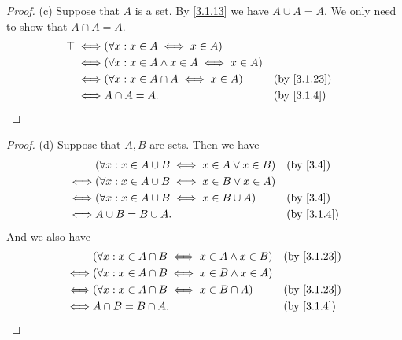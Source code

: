 \begin{proof}{(c)}
  Suppose that \(A\) is a set.
  By \cref{3.1.13} we have \(A \cup A = A\).
  We only need to show that \(A \cap A = A\).
  \begin{align*}
    \top \iff & (\forall x : x \in A \iff x \in A)                                              \\
    \iff      & (\forall x : x \in A \land x \in A \iff x \in A)                                \\
    \iff      & (\forall x : x \in A \cap A \iff x \in A)        &  & \text{(by \cref{3.1.23})} \\
    \iff      & A \cap A = A.                                    &  & \text{(by \cref{3.1.4})}
  \end{align*}
\end{proof}

\begin{proof}{(d)}
  Suppose that \(A, B\) are sets.
  Then we have
  \begin{align*}
         & (\forall x : x \in A \cup B \iff x \in A \lor x \in B) &  & \text{(by \cref{3.4})}   \\
    \iff & (\forall x : x \in A \cup B \iff x \in B \lor x \in A)                               \\
    \iff & (\forall x : x \in A \cup B \iff x \in B \cup A)       &  & \text{(by \cref{3.4})}   \\
    \iff & A \cup B = B \cup A.                                   &  & \text{(by \cref{3.1.4})}
  \end{align*}
  And we also have
  \begin{align*}
         & (\forall x : x \in A \cap B \iff x \in A \land x \in B) &  & \text{(by \cref{3.1.23})} \\
    \iff & (\forall x : x \in A \cap B \iff x \in B \land x \in A)                                \\
    \iff & (\forall x : x \in A \cap B \iff x \in B \cap A)        &  & \text{(by \cref{3.1.23})} \\
    \iff & A \cap B = B \cap A.                                    &  & \text{(by \cref{3.1.4})}
  \end{align*}
\end{proof}

